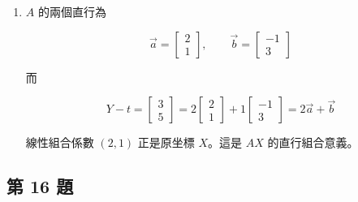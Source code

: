 \documentclass[11pt,a4paper]{article}
\begin{document}
\begin{enumerate}
  \(A\) 的判別量為 \(2(3)-(-1)(1)=7\)，所以

  \[
  A^{-1}=\frac17\begin{bmatrix}3&1\\-1&2\end{bmatrix}
  \]

  因此

  \[
  X=A^{-1}(Y-t)
  =\frac17\begin{bmatrix}3&1\\-1&2\end{bmatrix}
  \begin{bmatrix}3\\5\end{bmatrix}
  =\frac17\begin{bmatrix}14\\7\end{bmatrix}
  =\begin{bmatrix}2\\1\end{bmatrix}
  \]
\item
  \(A\) 的兩個直行為

  \[
  \vec a=\begin{bmatrix}2\\1\end{bmatrix},
  \qquad
  \vec b=\begin{bmatrix}-1\\3\end{bmatrix}
  \]

  而

  \[
  Y-t=\begin{bmatrix}3\\5\end{bmatrix}
  =2\begin{bmatrix}2\\1\end{bmatrix}
  +1\begin{bmatrix}-1\\3\end{bmatrix}
  =2\vec a+\vec b
  \]

  線性組合係數 \((2,1)\) 正是原坐標 \(X\)。這是 \(AX\) 的直行組合意義。
\end{enumerate}

\subsection{第 16 題}\label{ux7b2c-16-ux984c}
\end{document}
